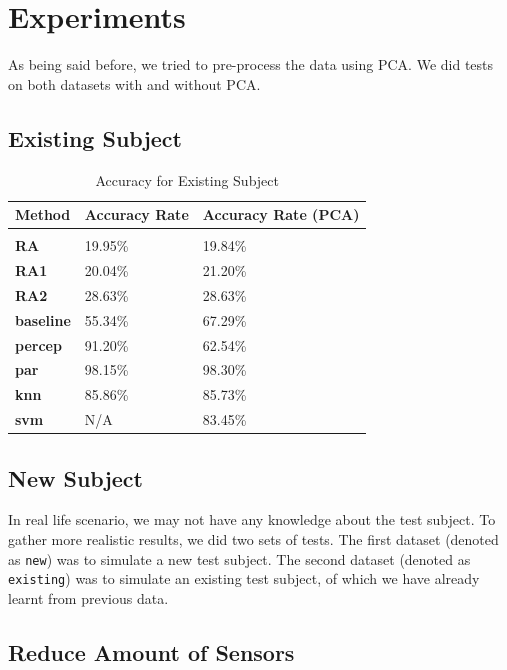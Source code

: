 \documentclass{article} %
\begin{document}
\section{Experiments}

As being said before, we tried to pre-process the data using PCA. We did tests on both datasets with and without PCA.

\subsection{Existing Subject}

\begin{table}[t]
\caption{Accuracy for Existing Subject}
\begin{center}
\begin{tabular}{lll}
{\bf Method} & {\bf Accuracy Rate} & {\bf Accuracy Rate (PCA)} \\
\hline \\
{\bf RA}       & 19.95\% & 19.84\% \\
{\bf RA1}      & 20.04\% & 21.20\% \\
{\bf RA2}      & 28.63\% & 28.63\% \\
{\bf baseline} & 55.34\% & 67.29\% \\
{\bf percep}   & 91.20\% & 62.54\% \\
{\bf par}      & 98.15\% & 98.30\% \\
{\bf knn}      & 85.86\% & 85.73\% \\
{\bf svm}      & N/A     & 83.45\% \\
\end{tabular}
\end{center}
\end{table}

\subsection{New Subject}

In real life scenario, we may not have any knowledge about the test subject. To gather more realistic results, we did two sets of tests. The first dataset (denoted as \texttt{new}) was to simulate a new test subject. The second dataset (denoted as \texttt{existing})  was to simulate an existing test subject, of which we have already learnt from previous data.

\subsection{Reduce Amount of Sensors}
\end{document}
